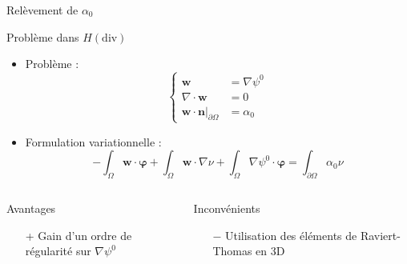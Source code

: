 \documentclass{beamer}
\newcommand{\grad}{{\nabla}}
\renewcommand{\div}{{\nabla\cdot}}
\newcommand{\restr}{{\big\rvert_{\partial\Omega}}}
\begin{document}
\begin{frame}{Relèvement de $\alpha_0$}
\begin{block}{Problème dans $ H(\mathrm{div})$}
\begin{itemize}
\item Problème :
\[\left\{\begin{aligned}
\mathbf{w} &= \grad \psi^0\\
\div\mathbf{w} &= 0\\
\mathbf{w}\cdot \mathbf{n}\restr &= \alpha_0
\end{aligned}\right.\]
\item Formulation variationnelle :
\[ -\int_\Omega \mathbf{w}\cdot\bm{\varphi} + \int_\Omega \mathbf{w}\cdot\grad\nu + \int_\Omega \grad\psi^0\cdot\bm{\varphi}  = \int_{\partial\Omega} \alpha_0\nu \]
\end{itemize}
\end{block}
\begin{columns}[t]
\begin{column}{5cm}
\begin{exampleblock}{Avantages}
\begin{itemize}
\item[+] Gain d'un ordre de régularité sur $\grad\psi^0$
\end{itemize}
\end{exampleblock}
\end{column}
\begin{column}{5cm}
\begin{alertblock}{Inconvénients}
\begin{itemize}
\item[$-$] Utilisation des éléments de Raviert-Thomas en 3D
\end{itemize}
\end{alertblock}
\end{column}
\end{columns}
\end{frame}
\end{document}
